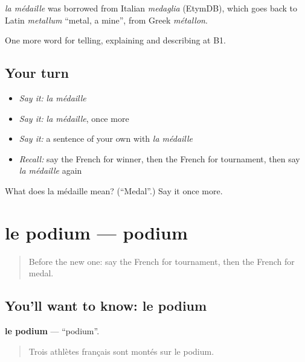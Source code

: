 \begin{cousinweb}
\emph{la médaille} was borrowed from Italian \emph{medaglia} (EtymDB), which goes back to Latin \emph{metallum} \textquotedblleft{}metal, a mine\textquotedblright{}, from Greek \emph{métallon}.
\end{cousinweb}

\begin{grammarlens}[title={What you've built}]
One more word for telling, explaining and describing at B1.
\end{grammarlens}

\subsection*{Your turn}
\begin{itemize}
\raggedright
  \item \emph{Say it:} \emph{la médaille}
  \item \emph{Say it:} \emph{la médaille}, once more
  \item \emph{Say it:} a sentence of your own with \emph{la médaille}
  \item \emph{Recall:} say the French for winner, then the French for tournament, then say \emph{la médaille} again
\end{itemize}

\begin{tcolorbox}[breakable,colback=teal!4,colframe=teal!35!black,title={Before you move on}]
What does la médaille mean? (\textquotedblleft{}Medal\textquotedblright{}.) Say it once more.
\end{tcolorbox}
\section[le podium]{le podium — podium}

\label{lesson:FR-C507-podium}



\begin{quote}
Before the new one: say the French for tournament, then the French for medal.
\end{quote}

\subsection*{You'll want to know: le podium}
\textbf{le podium} — \textquotedblleft{}podium\textquotedblright{}.

\begin{quote}
Trois athlètes français sont montés sur le podium.
\end{quote}

